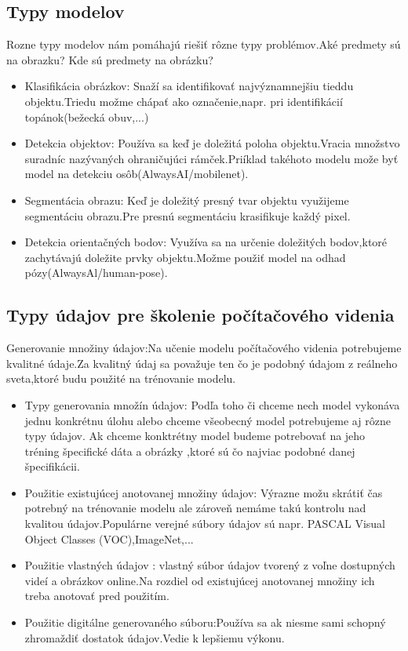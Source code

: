\documentclass[10pt,twoside,slovak,a4paper]{coursepaper}
\begin{document}
\subsection{Typy modelov} \label{ina:nejako}
Rozne typy modelov nám pomáhajú riešiť rôzne typy problémov.Aké predmety sú na obrazku? Kde sú predmety na obrázku?
\begin{itemize}
\item Klasifikácia obrázkov: Snaží sa identifikovať najvýznamnejšiu tieddu objektu.Triedu možme chápať ako označenie,napr. pri identifikácií topánok(bežecká obuv,...)

\item Detekcia objektov: Používa sa keď je doležitá poloha objektu.Vracia množstvo suradníc nazývaných ohraničujúci rámček.Priíklad takéhoto modelu može byť model na detekciu osôb(AlwaysAI/mobilenet).

\item Segmentácia obrazu: Keď je doležitý presný tvar objektu využijeme segmentáciu obrazu.Pre presnú segmentáciu krasifikuje každý pixel.

\item Detekcia orientačných bodov: Využíva sa na určenie doležitých bodov,ktoré zachytávajú doležite prvky objektu.Možme použiť model na odhad pózy(AlwaysAl/human-pose).
\end{itemize}

\subsection{Typy údajov pre školenie počítačového videnia}
Generovanie množiny údajov:Na učenie modelu počítačového videnia potrebujeme kvalitné údaje.Za kvalitný údaj sa považuje ten čo je podobný údajom z reálneho sveta,ktoré budu použité na trénovanie modelu.

\begin{itemize}
\item Typy generovania množín údajov: Podľa toho či chceme nech model vykonáva jednu konkrétnu úlohu alebo chceme všeobecný model potrebujeme aj rôzne typy údajov.
Ak chceme konktrétny model budeme potrebovať na jeho tréning špecifické dáta a obrázky ,ktoré sú čo najviac podobné danej špecifikácii.
\item Použitie existujúcej anotovanej množiny údajov: Výrazne možu skrátiť čas potrebný na trénovanie modelu ale zároveň nemáme takú kontrolu nad kvalitou údajov.Populárne verejné súbory údajov sú napr. PASCAL Visual Object Classes (VOC),ImageNet,...
\item Použitie vlastných údajov : vlastný súbor údajov tvorený z voľne dostupných videí a obrázkov online.Na rozdiel od existujúcej anotovanej množiny ich treba anotovať pred použitím.
\item Použitie digitálne generovaného súboru:Používa sa ak niesme sami schopný zhromaždiť dostatok údajov.Vedie k lepšiemu výkonu.

\end{itemize}
\end{document}
